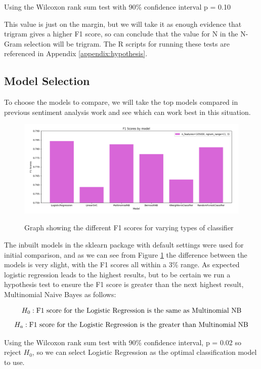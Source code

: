 Using the Wilcoxon rank sum test with 90\% confidence interval 
p = 0.10

This value is just on the margin, but we will take it as enough evidence that trigram gives a higher F1 score, so can conclude that the value for N in the N-Gram selection will be trigram. The R scripts for running these tests are referenced in Appendix \ref{appendix:hypothesis}.


\subsection{Model Selection}

To choose the models to compare, we will take the top models compared in previous sentiment analysis work \cite{towardsDS} and see which can work best in this situation.

\begin{figure}[h]
\caption{Graph showing the different F1 scores for varying types of classifier}
\centering
\includegraphics[scale=0.5]{graphs/models.png}
\label{model:graph}
\end{figure}


The inbuilt models in the sklearn package with default settings were used for initial comparison, and as we can see from Figure \ref{model:graph} the difference between the models is very slight, with the F1 scores all within a 3\% range. As expected logistic regression leads to the highest results, but to be certain we run a hypothesis test to ensure the F1 score is greater than the next highest result, Multinomial Naive Bayes as follows:

$$ H_0: \textnormal{F1 score for the Logistic Regression is the same as Multinomial NB}$$
$$ H_a: \textnormal{F1 score for the Logistic Regression is the greater than Multinomial NB}$$

Using the Wilcoxon rank sum test with 90\% confidence interval, p = 0.02 so reject $H_0$, so we can select Logistic Regression as the optimal classification model to use.


